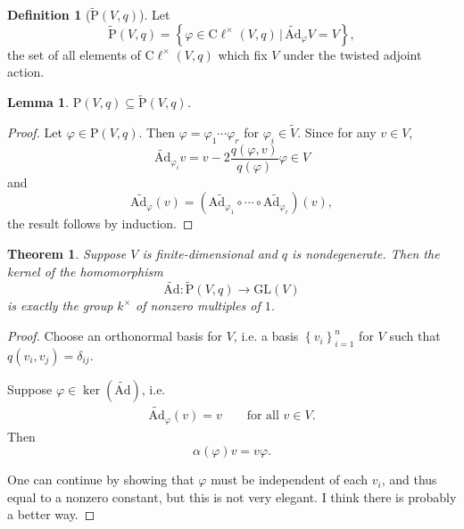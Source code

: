 \documentclass[a4paper,10pt]{scrreprt}
\newcommand{\cliff}{\mathrm{C}\ell}
\newcommand{\Ad}{\mathrm{Ad}}
\newcommand{\tAd}{\widetilde{\mathrm{Ad}}}
\newcommand{\tP}{\tilde{\mathrm{P}}}
\newcommand{\GL}{\mathrm{GL}}
\theoremstyle{definition}
\newtheorem{definition}{Definition}[section]
\theoremstyle{plain}
\newtheorem{theorem}{Theorem}[section]
\newtheorem{lemma}{Lemma}[section]
\theoremstyle{remark}
\begin{document}
\begin{definition}[$\tP(V, q)$]
  \label{def:twistedp}
  Let 
  \begin{equation*}
    \tP(V, q) = \left\{ \varphi \in \cliff^{\times}(V, q)\,\bigg|\, \tAd_{\varphi}V = V \right\},
  \end{equation*}
  the set of all elements of $\cliff^{\times}(V, q)$ which fix $V$ under the twisted adjoint action.
\end{definition}
\begin{lemma} $\mathrm{P}(V, q) \subseteq \tP(V, q)$.
\end{lemma}
\begin{proof}
  Let $\varphi \in \mathrm{P}(V, q)$. Then $\varphi = \varphi_{1}\cdots \varphi_{r}$ for $\varphi_{i} \in \tilde{V}$. Since for any $v \in V$, 
  \begin{equation*}
    \tAd_{\varphi_{i}}v = v - 2\frac{q(\varphi, v)}{q(\varphi)}\varphi \in V
  \end{equation*}
  and
  \begin{equation*}
    \widetilde{\Ad_{\varphi}}(v) = (\widetilde{\Ad_{\varphi_{1}}} \circ \cdots \circ \widetilde{\Ad_{\varphi_{r}}}) (v),
  \end{equation*}
  the result follows by induction.
\end{proof}

\begin{theorem}
  \label{thm:kerneloftwistedadjointisscalars}
  Suppose $V$ is finite-dimensional and $q$ is nondegenerate. Then the kernel of the homomorphism
  \begin{equation*}
    \tAd\colon \tP(V, q) \to \GL(V)
  \end{equation*}
  is exactly the group $k^{\times}$ of nonzero multiples of $1$.
\end{theorem} 
\begin{proof}
  Choose an orthonormal basis for $V$, i.e. a basis $\left\{ v_{i} \right\}_{i=1}^{n}$ for $V$ such that $q(v_{i}, v_{j}) = \delta_{ij}$.

  Suppose $\varphi \in \ker(\tAd)$, i.e.
  \begin{eqnarray*}
    \tAd_{\varphi}(v) = v\qquad\text{for all }v \in V.
  \end{eqnarray*}
  Then
  \begin{equation*}
    \alpha(\varphi)v = v\varphi.
  \end{equation*}

  One can continue by showing that $\varphi$ must be independent of each $v_{i}$, and thus equal to a nonzero constant, but this is not very elegant. I think there is probably a better way.
\end{proof}
\end{document}
